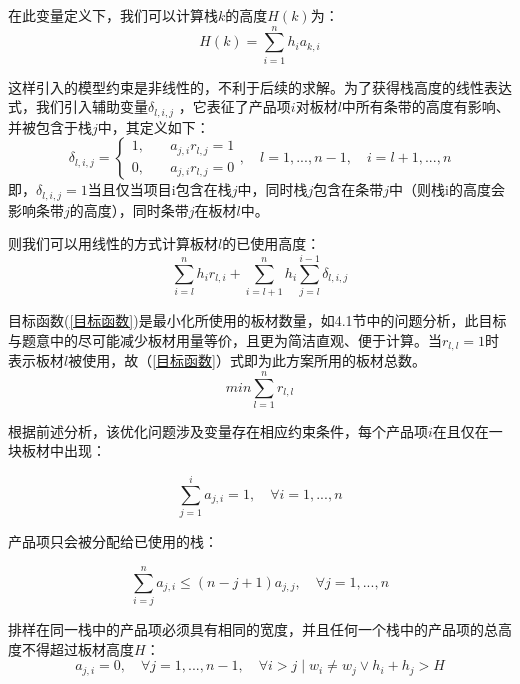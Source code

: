 \documentclass[bwprint]{gmcmthesis}
\begin{document}
在此变量定义下，我们可以计算栈$k$的高度$H(k)$为：
\begin{equation}
    H(k)=\sum_{i=1}^{n} h_i a_{k,i}
\end{equation}


这样引入的模型约束是非线性的，不利于后续的求解。为了获得栈高度的线性表达式，我们引入辅助变量$\delta_{l,i,j}$ ，它表征了产品项$i$对板材$l$中所有条带的高度有影响、并被包含于栈$j$中，其定义如下：
\begin{equation}
    \delta_{l,i,j}=  
    \begin{cases}
        1, \quad  & a_{j,i} r_{l,j}=1\\
        0, \quad  & a_{j,i} r_{l,j}=0
    \end{cases},\quad l=1,...,n-1, \quad i=l+1,...,n
\end{equation}
即，$\delta_{l,i,j} = 1$当且仅当项目i包含在栈$j$中，同时栈$j$包含在条带$j$中（则栈i的高度会影响条带$j$的高度），同时条带$j$在板材$l$中。

则我们可以用线性的方式计算板材$l$的已使用高度：
\begin{equation}
\sum_{i=l}^{n} h_i r_{l,i}+\sum_{i=l+1}^{n} h_i \sum_{j=l}^{i-1} \delta_{l,i,j}
\end{equation}

目标函数(\ref{目标函数})是最小化所使用的板材数量，如4.1节中的问题分析，此目标与题意中的尽可能减少板材用量等价，且更为简洁直观、便于计算。当$ r_{l,l}=1 $时表示板材$l$被使用，故（\ref{目标函数}）式即为此方案所用的板材总数。
\begin{equation}
    min \sum_{l=1}^{n}  r_{l,l} \label{目标函数}
 \end{equation}


根据前述分析，该优化问题涉及变量存在相应约束条件，每个产品项$i$在且仅在一块板材中出现：

\begin{equation}
    \sum_{j=1}^{i}  a_{j,i} =1,\quad \forall i=1,...,n \label{产品项必须排}
\end{equation}


产品项只会被分配给已使用的栈：

\begin{equation}
   \sum_{i=j}^{n}  a_{j,i} \le (n-j+1)a_{j,j},\quad \forall j=1,...,n  \label{产品项只给已使用栈}
\end{equation}

排样在同一栈中的产品项必须具有相同的宽度，并且任何一个栈中的产品项的总高度不得超过板材高度$H$：
\begin{equation}
     a_{j,i}=0, \quad \forall j=1,...,n-1,\quad  \forall i>j \mid w_i \neq w_j \vee h_i+h_j>H \label{相同宽度}
 \end{equation}
\end{document}
